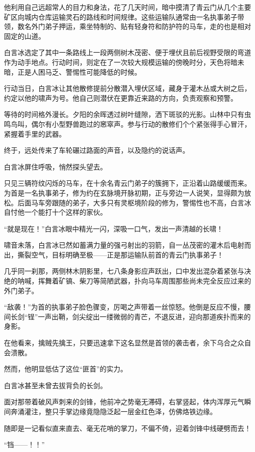 他利用自己远超常人的目力和身法，花了几天时间，暗中摸清了青云门从几个主要矿区向城内仓库运输灵石的路线和时间规律。这些运输队通常由一名执事弟子带领，数名外门弟子押运，乘坐特制的、贴有轻身符和防护符的马车，走的也是相对固定的山道。

白言冰选定了其中一条路线上一段两侧树木茂密、便于埋伏且前后视野受限的弯道作为动手地点。行动时间，则定在了一次较大规模运输的傍晚时分，天色将暗未暗，正是人困马乏、警惕性可能降低的时候。

行动当日，白言冰让其他散修提前分散潜入埋伏区域，藏身于灌木丛或大树之后，约定以他的啸声为号。他自己则潜伏在更靠近来路的方向，负责观察和预警。

等待的时间格外漫长。夕阳的余晖透过树叶缝隙，洒下斑驳的光影。山林中只有虫鸣鸟叫，偶尔有小型野兽跑过的窸窣声。参与行动的散修们个个紧张得手心冒汗，紧握着手里的武器。

终于，远处传来了车轮碾过路面的声音，以及隐约的说话声。

白言冰屏住呼吸，悄然探头望去。

只见三辆符纹闪烁的马车，在十余名青云门弟子的簇拥下，正沿着山路缓缓而来。为首是一名执事弟子，修为约在玄脉境开脉初期，正与旁边一人说笑，显得颇为放松。后面马车旁跟随的弟子，大多只有灵枢境阶段的修为，警惕性也不高，白言冰自忖他一个能打十个这样的家伙。

“就是现在！”白言冰眼中精光一闪，深吸一口气，发出一声清越的长啸！

啸音未落，白言冰已然如蓄满力量的强弓射出的羽箭，自一丛茂密的灌木后电射而出，撕裂空气，目标明确至极——正是那运输队前首的青云门执事弟子！

几乎同一刹那，两侧林木阴影里，七八条身影应声跃出，口中发出混杂着紧张与决绝的呐喊，挥舞着矿镐、柴刀等简陋武器，扑向马车周围那些尚未完全反应过来的外门弟子。

“敌袭！”为首的执事弟子脸色骤变，厉喝之声带着一丝惊怒。他倒是反应不慢，腰间长剑“锃”一声出鞘，剑尖绽出一缕微弱的青芒，不退反进，迎向那道疾扑而来的身影。

在他看来，擒贼先擒王，只要迅速拿下这名显然是首领的袭击者，余下乌合之众自会溃散。

然而，他明显低估了这位“匪首”的实力。

白言冰甚至未曾去拔背负的长剑。

面对那带着破风声刺来的剑锋，他前冲之势毫无滞碍，右掌竖起，体内浑厚元气瞬间奔涌灌注，整只手掌边缘竟隐隐泛起一层金红色泽，仿佛烙铁边缘。

随即是一记看似直来直去、毫无花哨的掌刀，不偏不倚，迎着剑锋中线硬劈而去！

“铛——！！”

